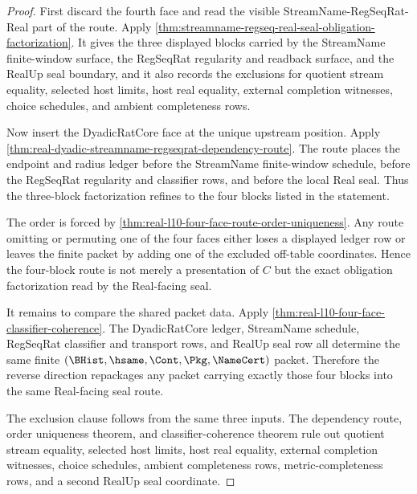 \begin{proof}
First discard the fourth face and read the visible StreamName-RegSeqRat-Real
part of the route. Apply
\autoref{thm:streamname-regseq-real-seal-obligation-factorization}. It gives
the three displayed blocks carried by the StreamName finite-window surface, the
RegSeqRat regularity and readback surface, and the RealUp seal boundary, and it
also records the exclusions for quotient stream equality, selected host limits,
host real equality, external completion witnesses, choice schedules, and ambient
completeness rows.

Now insert the DyadicRatCore face at the unique upstream position. Apply
\autoref{thm:real-dyadic-streamname-regseqrat-dependency-route}. The route
places the endpoint and radius ledger before the StreamName finite-window
schedule, before the RegSeqRat regularity and classifier rows, and before the
local Real seal. Thus the three-block factorization refines to the four blocks
listed in the statement.

The order is forced by
\autoref{thm:real-l10-four-face-route-order-uniqueness}. Any route omitting or
permuting one of the four faces either loses a displayed ledger row or leaves
the finite packet by adding one of the excluded off-table coordinates. Hence
the four-block route is not merely a presentation of $C$ but the exact
obligation factorization read by the Real-facing seal.

It remains to compare the shared packet data. Apply
\autoref{thm:real-l10-four-face-classifier-coherence}. The DyadicRatCore
ledger, StreamName schedule, RegSeqRat classifier and transport rows, and
RealUp seal row all determine the same finite
$(\BHist,\hsame,\Cont,\Pkg,\NameCert)$ packet. Therefore the reverse direction
repackages any packet carrying exactly those four blocks into the same
Real-facing seal route.

The exclusion clause follows from the same three inputs. The dependency route,
order uniqueness theorem, and classifier-coherence theorem rule out quotient
stream equality, selected host limits, host real equality, external completion
witnesses, choice schedules, ambient completeness rows, metric-completeness
rows, and a second RealUp seal coordinate.
\end{proof}
